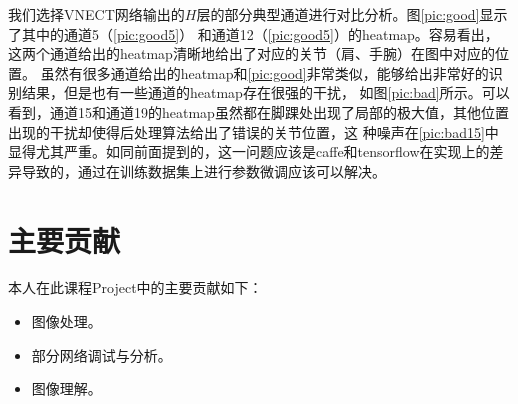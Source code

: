 \documentclass[a4paper, 10pt]{article}
\begin{document}
我们选择VNECT网络输出的$H$层的部分典型通道进行对比分析。图\ref{pic:good}显示了其中的通道5（\ref{pic:good5}）
和通道12（\ref{pic:good5}）的heatmap。容易看出，这两个通道给出的heatmap清晰地给出了对应的关节（肩、手腕）在图中对应的位置。
虽然有很多通道给出的heatmap和\ref{pic:good}非常类似，能够给出非常好的识别结果，但是也有一些通道的heatmap存在很强的干扰，
如图\ref{pic:bad}所示。可以看到，通道15和通道19的heatmap虽然都在脚踝处出现了局部的极大值，其他位置出现的干扰却使得后处理算法给出了错误的关节位置，这
种噪声在\ref{pic:bad15}中显得尤其严重。如同前面提到的，这一问题应该是caffe和tensorflow在实现上的差异导致的，通过在训练数据集上进行参数微调应该可以解决。

\section{主要贡献}
本人在此课程Project中的主要贡献如下：
\begin{itemize}
        \item 图像处理。
        \item 部分网络调试与分析。
        \item 图像理解。
\end{itemize}






\end{document}
